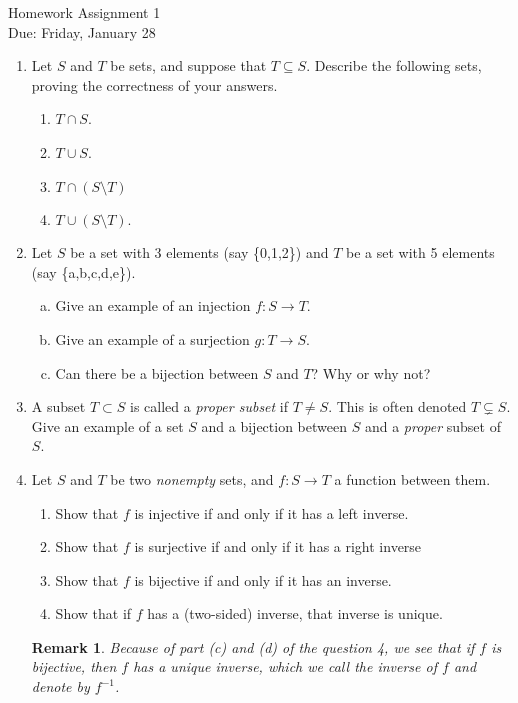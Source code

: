 \documentclass[11pt]{article}
\newtheorem*{remark}{Remark}
\begin{document}
\begin{center}
\Large {Homework Assignment 1}\\
\small {Due: Friday, January 28}
\end{center}
\begin{enumerate}
\item{
  Let $S$ and $T$ be sets, and suppose that $T\subseteq S$.  Describe the following sets, proving the correctness of your answers.
  \begin{enumerate}
    \item{
    $T\cap S$.
    }
    \item{
    $T\cup S$.
    }
    \item{
    $T\cap(S\setminus T)$
    }
    \item{
    $T\cup(S\setminus T)$.
    }
  \end{enumerate}
}
\item Let $S$ be a set with 3 elements (say \{0,1,2\}) and $T$ be a set with 5 elements (say \{a,b,c,d,e\}).
\begin{enumerate}[(a)]
\item Give an example of an injection $f:S\to T$.
\item Give an example of a surjection $g:T\to S$.
\item Can there be a bijection between $S$ and $T$? Why or why not?
\end{enumerate}
\item A subset $T\subset S$ is called a \textit{proper subset} if $T\not= S$.  This is often denoted $T\subsetneq S$.  Give an example of a set $S$ and a bijection between $S$ and a \textit{proper} subset of $S$.
\item Let $S$ and $T$ be two \textit{nonempty} sets, and $f:S\to T$ a function between them.
\begin{enumerate}
  \item{Show that $f$ is injective if and only if it has a left inverse.}
  \item{Show that $f$ is surjective if and only if it has a right inverse}
  \item{Show that $f$ is bijective if and only if it has an inverse.}
  \item{Show that if $f$ has a (two-sided) inverse, that inverse is unique.}
\end{enumerate}
\begin{remark}
  Because of part (c) and (d) of the question 4, we see that if $f$ is bijective, then $f$ has a unique inverse, which we call \textit{the inverse of $f$} and denote by $f^{-1}$.

\end{remark}
\end{enumerate}
\end{document}
